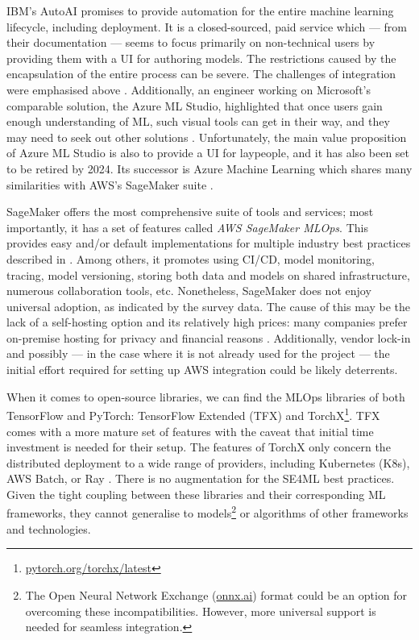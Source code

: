 IBM's AutoAI \cite{wang2020autoai} promises to provide automation for the entire machine learning lifecycle, including deployment. It is a closed-sourced, paid service which --- from their documentation --- seems to focus primarily on non-technical users by providing them with a UI for authoring models. The restrictions caused by the encapsulation of the entire process can be severe. The challenges of integration were emphasised above \cite{sculley2015hidden}. Additionally, an engineer working on Microsoft's comparable solution, the Azure ML Studio, highlighted that once users gain enough understanding of ML, such visual tools can get in their way, and they may need to seek out other solutions \cite{amershi2019software}. Unfortunately, the main value proposition of Azure ML Studio is also to provide a UI for laypeople, and it has also been set to be retired by 2024. Its successor is Azure Machine Learning which shares many similarities with AWS's SageMaker suite \cite{joshi2020amazon}.

SageMaker offers the most comprehensive suite of tools and services; most importantly, it has a set of features called \textit{AWS SageMaker MLOps}. This provides easy and/or default implementations for multiple industry best practices described in \cite{serban2020adoption,serban2021practices,john2020ai}. Among others, it promotes using CI/CD, model monitoring, tracing, model versioning, storing both data and models on shared infrastructure, numerous collaboration tools, etc. Nonetheless, SageMaker does not enjoy universal adoption, as indicated by the survey data. The cause of this may be the lack of a self-hosting option and its relatively high prices: many companies prefer on-premise hosting for privacy and financial reasons \cite{bosch2021engineering}. Additionally, vendor lock-in and possibly --- in the case where it is not already used for the project --- the initial effort required for setting up AWS integration could be likely deterrents.

When it comes to open-source libraries, we can find the MLOps libraries of both TensorFlow and PyTorch: TensorFlow Extended (TFX) \cite{baylor2017tfx} and TorchX\footnote{\href{https://pytorch.org/torchx/latest/}{pytorch.org/torchx/latest}}. TFX comes with a more mature set of features with the caveat that initial time investment is needed for their setup. The features of TorchX only concern the distributed deployment to a wide range of providers, including Kubernetes (K8s), AWS Batch, or Ray \cite{moritz2018ray}. There is no augmentation for the SE4ML best practices. Given the tight coupling between these libraries and their corresponding ML frameworks, they cannot generalise to models\footnote{The Open Neural Network Exchange (\href{https://onnx.ai/}{onnx.ai}) format could be an option for overcoming these incompatibilities. However, more universal support is needed for seamless integration.} or algorithms of other frameworks and technologies. 

